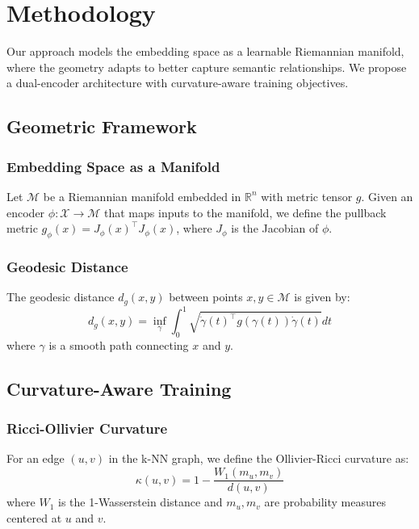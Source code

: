 \section{Methodology}
\label{sec:method}

Our approach models the embedding space as a learnable Riemannian manifold, where the geometry adapts to better capture semantic relationships. We propose a dual-encoder architecture with curvature-aware training objectives.

\subsection{Geometric Framework}

\subsubsection{Embedding Space as a Manifold}
Let $\mathcal{M}$ be a Riemannian manifold embedded in $\mathbb{R}^n$ with metric tensor $g$. Given an encoder $\phi: \mathcal{X} \rightarrow \mathcal{M}$ that maps inputs to the manifold, we define the pullback metric $g_{\phi}(x) = J_\phi(x)^\top J_\phi(x)$, where $J_\phi$ is the Jacobian of $\phi$.

\subsubsection{Geodesic Distance}
The geodesic distance $d_g(x,y)$ between points $x,y \in \mathcal{M}$ is given by:
\begin{equation}
d_g(x,y) = \inf_{\gamma} \int_0^1 \sqrt{\dot{\gamma}(t)^\top g(\gamma(t))\dot{\gamma}(t)} dt
\end{equation}
where $\gamma$ is a smooth path connecting $x$ and $y$.

\subsection{Curvature-Aware Training}

\subsubsection{Ricci-Ollivier Curvature}
For an edge $(u,v)$ in the k-NN graph, we define the Ollivier-Ricci curvature as:
\begin{equation}
\kappa(u,v) = 1 - \frac{W_1(m_u, m_v)}{d(u,v)}
\end{equation}
where $W_1$ is the 1-Wasserstein distance and $m_u, m_v$ are probability measures centered at $u$ and $v$.

